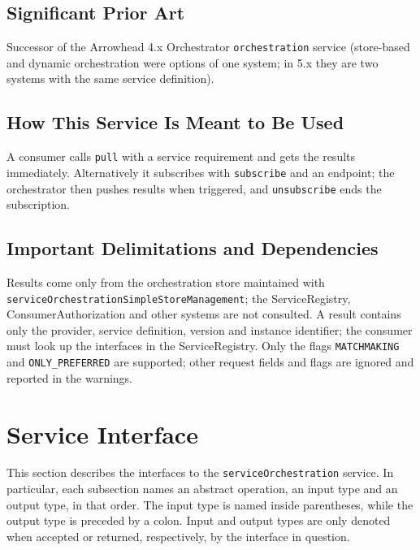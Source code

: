 \documentclass[a4paper]{arrowhead}
\begin{document}
\subsection{Significant Prior Art}

Successor of the Arrowhead 4.x Orchestrator \texttt{orchestration} service (store-based and dynamic orchestration were options of one system; in 5.x they are two systems with the same service definition).

\subsection{How This Service Is Meant to Be Used}

A consumer calls \texttt{pull} with a service requirement and gets the results immediately. Alternatively it subscribes with \texttt{subscribe} and an endpoint; the orchestrator then pushes results when triggered, and \texttt{unsubscribe} ends the subscription.

\subsection{Important Delimitations and Dependencies}
\label{sec:delimitations}

Results come only from the orchestration store maintained with \texttt{service\allowbreak{}Orchestration\allowbreak{}Simple\allowbreak{}Store\allowbreak{}Management}; the ServiceRegistry, Consumer\allowbreak{}Authorization and other systems are not consulted. A result contains only the provider, service definition, version and instance identifier; the consumer must look up the interfaces in the ServiceRegistry. Only the flags \texttt{MATCHMAKING} and \texttt{ONLY\_\allowbreak{}PREFERRED} are supported; other request fields and flags are ignored and reported in the warnings.

\newpage

\section{Service Interface}
\label{sec:operations}

This section describes the interfaces to the \texttt{service\allowbreak{}Orchestration} service.
In particular, each subsection names an abstract operation, an input type and an output type, in that order.
The input type is named inside parentheses, while the output type is preceded by a colon.
Input and output types are only denoted when accepted or returned, respectively, by the interface in question.
\end{document}
